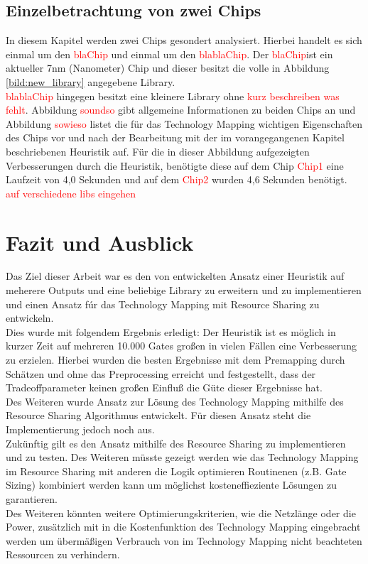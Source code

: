 \documentclass[11pt, a4paper, german]{article}
\newcommand{\TM}{Technology  Mapping }
\begin{document}
\subsection{Einzelbetrachtung von zwei Chips}
In diesem Kapitel werden zwei Chips gesondert analysiert. Hierbei handelt es sich einmal um den \textcolor{red}{blaChip} und einmal um den \textcolor{red}{blablaChip}. Der \textcolor{red}{blaChip}ist ein aktueller 7nm (Nanometer) Chip und dieser besitzt die volle in Abbildung \ref{bild:new_library} angegebene Library. \\ 
\textcolor{red}{blablaChip} hingegen besitzt eine kleinere Library ohne \textcolor{red}{kurz beschreiben was fehlt}. Abbildung \textcolor{red}{soundso} gibt allgemeine Informationen zu beiden Chips an und Abbildung \textcolor{red}{sowieso} listet die f\"ur das \TM wichtigen Eigenschaften des Chips vor und nach der Bearbeitung mit der im vorangegangenen Kapitel beschriebenen Heuristik auf. 
F\"ur die in dieser Abbildung aufgezeigten Verbesserungen durch die Heuristik, ben\"otigte diese auf dem Chip \textcolor{red}{Chip1} eine Laufzeit von 4,0 Sekunden und auf dem \textcolor{red}{Chip2} wurden 4,6 Sekunden ben\"otigt.\\

\textcolor{red}{auf verschiedene libs eingehen}
\section{Fazit und Ausblick}
\label{sec:fazit_und_ausblick}
Das Ziel dieser Arbeit war es den von \cite{Elbert} entwickelten Ansatz einer Heuristik auf meherere Outputs und eine beliebige Library zu erweitern und zu implementieren und einen Ansatz f\'ur das \TM mit Resource Sharing zu entwickeln. \\
Dies wurde mit folgendem Ergebnis erledigt: Der Heuristik ist es m\"oglich in kurzer Zeit auf mehreren 10.000 Gates gro{\ss}en in vielen F\"allen eine Verbesserung zu erzielen. Hierbei wurden die besten Ergebnisse mit dem Premapping durch Sch\"atzen und ohne das Preprocessing erreicht und festgestellt, dass der Tradeoffparameter keinen gro{\ss}en Einflu{\ss} die G\"ute dieser Ergebnisse hat. \\
Des Weiteren wurde Ansatz zur L\"osung des \TM mithilfe des Resource Sharing Algorithmus entwickelt. F\"ur diesen Ansatz steht die Implementierung jedoch noch aus. \\

Zuk\"unftig gilt es den Ansatz mithilfe des Resource Sharing zu implementieren und zu testen. Des Weiteren m\"usste gezeigt werden wie das \TM im Resource Sharing mit anderen die Logik optimieren Routinenen (z.B. Gate Sizing) kombiniert werden kann um m\"oglichst kosteneffieziente L\"osungen zu garantieren.\\
Des Weiteren k\"onnten weitere Optimierungskriterien, wie die Netzl\"ange oder die Power, zus\"atzlich mit in die Kostenfunktion des \TM eingebracht werden um \"uberm\"a{\ss}igen Verbrauch von im \TM nicht beachteten Ressourcen zu verhindern.

\newpage
{}
\nocite{*}
\renewcommand{\refname}{9 \,\, Literaturverzeichnis}
{ \footnotesize


}
\end{document}
